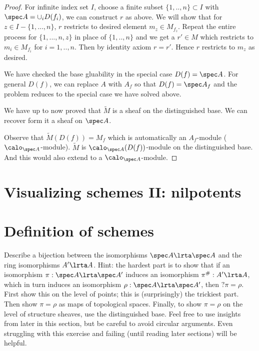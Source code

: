 \begin{proof}
For infinite index set $I$, choose a finite subset $\{1,..,n\}\subset I$ with $\spec A=\cup_i D(f_i)$, we can construct $r$ as above. We will show that for $z\in I-\{1,...,n\}$, $r$ restricts to desired element $m_z\in M_{f_z}$. Repeat the entire process for $\{1,...,n,z\}$ in place of $\{1,..,n\}$ and we get a $r'\in M$ which restricts to $m_i\in M_{f_i}$ for $i=1,..,n$. Then by identity axiom $r=r'$. Hence $r$ restricts to $m_z$ as desired.

We have checked the base gluability in the special case $D(f)=\spec A$. For general $D(f)$, we can replace $A$ with $A_f$ so that $D(f)=\spec A_f$ and the problem reduces to the special case we have solved above.

We have up to now proved that $\tilde{M}$ is a sheaf on the distinguished base. We can recover form it a sheaf on $\spec A$.

Observe that $\tilde{M}(D(f))=M_f$ which is automatically an $A_f$-module ($\calo_{\spec A}$-module). $\tilde{M}$ is $\calo_{\spec A}(D(f))$-module on the distinguished base. And this would also extend to a $\calo_{\spec A}$-module.
\end{proof}





\section{Visualizing schemes II: nilpotents}
\section{Definition of schemes
}

\begin{exr}
Describe a bijection between the isomorphisms $\spec A \lrta \spec A$ and the ring isomorphisms $A' \lrta A$. Hint: the hardest part is to show that if an isomorphism $\pi: \spec A\lrta \spec A'$ induces an isomorphism $\pi^\#:A' \lrta A$, which in turn induces an isomorphism $\rho: \spec A \lrta  \spec A'$, then $?\pi = \rho$. First show this on the level of points; this is (surprisingly) the trickiest part. Then show $\pi = \rho$ as maps of topological spaces. Finally, to show $\pi = \rho$ on the level of structure sheaves, use the distinguished base. Feel free to use insights from later in this section, but be careful to avoid circular arguments. Even struggling with this exercise and failing (until reading later sections) will be helpful.
\end{exr}


